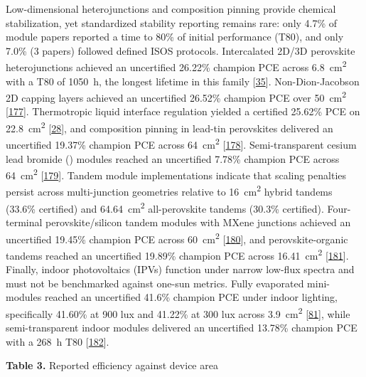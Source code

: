 \documentclass[
  11pt,
]{article}
\begin{document}
Low-dimensional heterojunctions and composition pinning provide chemical
stabilization, yet standardized stability reporting remains rare: only
4.7\% of module papers reported a time to 80\% of initial performance
(T80), and only 7.0\% (3 papers) followed defined ISOS protocols.
Intercalated 2D/3D perovskite heterojunctions achieved an uncertified
26.22\% champion PCE across \qty{6.8}{\centi\meter\squared} with a T80
of \qty{1050}{\hour}, the longest lifetime in this family
{[}\href{https://doi.org/10.1007/s40820-025-02058-8}{35}{]}.
Non-Dion-Jacobson 2D capping layers achieved an uncertified 26.52\%
champion PCE over \qty{50}{\centi\meter\squared}
{[}\href{https://doi.org/10.1002/anie.2974414}{177}{]}. Thermotropic
liquid interface regulation yielded a certified 25.62\% PCE on
\qty{22.8}{\centi\meter\squared}
{[}\href{https://doi.org/10.1038/s41467-025-68231-0}{28}{]}, and
composition pinning in lead-tin perovskites delivered an uncertified
19.37\% champion PCE across \qty{64}{\centi\meter\squared}
{[}\href{https://doi.org/10.1002/inf2.70153}{178}{]}. Semi-transparent
cesium lead bromide () modules reached an uncertified 7.78\%
champion PCE across \qty{64}{\centi\meter\squared}
{[}\href{https://doi.org/10.1016/j.cej.2026.176242}{179}{]}. Tandem
module implementations indicate that scaling penalties persist across
multi-junction geometries relative to \qty{16}{\centi\meter\squared}
hybrid tandems (33.6\% certified) and \qty{64.64}{\centi\meter\squared}
all-perovskite tandems (30.3\% certified). Four-terminal
perovskite/silicon tandem modules with MXene junctions achieved an
uncertified 19.45\% champion PCE across \qty{60}{\centi\meter\squared}
{[}\href{https://doi.org/10.1038/s41467-026-70002-4}{180}{]}, and
perovskite-organic tandems reached an uncertified 19.89\% champion PCE
across \qty{16.41}{\centi\meter\squared}
{[}\href{https://doi.org/10.1002/adfm.202532203}{181}{]}. Finally,
indoor photovoltaics (IPVs) function under narrow low-flux spectra and
must not be benchmarked against one-sun metrics. Fully evaporated
mini-modules reached an uncertified 41.6\% champion PCE under indoor
lighting, specifically 41.60\% at 900 lux and 41.22\% at 300 lux across
\qty{3.9}{\centi\meter\squared}
{[}\href{https://doi.org/10.1002/smtd.70654}{81}{]}, while
semi-transparent indoor modules delivered an uncertified 13.78\%
champion PCE with a \qty{268}{\hour} T80
{[}\href{https://doi.org/10.1002/aenm.202505931}{182}{]}.

\textbf{Table 3.} Reported efficiency against device area
\end{document}
